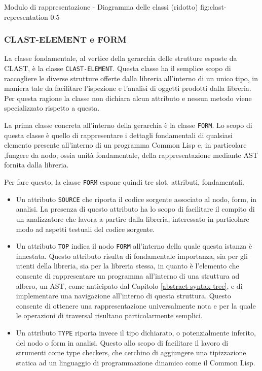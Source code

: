       {Modulo di rappresentazione - Diagramma delle classi (ridotto)}
      {fig:clast-representation}
      {0.5}

\subsubsection{CLAST-ELEMENT e FORM}

La classe fondamentale, al vertice della gerarchia delle strutture esposte da
CLAST, è la classe \texttt{CLAST-ELEMENT}. Questa classe ha il semplice scopo
di raccogliere le diverse strutture offerte dalla libreria all'interno di un
unico tipo, in maniera tale da facilitare l’ispezione e l’analisi di oggetti
prodotti dalla libreria. Per questa ragione la classe non dichiara alcun
attributo e nessun metodo viene specializzato rispetto a questa.

La prima classe concreta all’interno della gerarchia è la classe \texttt{FORM}.
Lo scopo di questa classe è quello di rappresentare i dettagli fondamentali di
qualsiasi elemento presente all’interno di un programma Common Lisp e, in
particolare ,fungere da nodo, ossia unità fondamentale, della rappresentazione
mediante AST fornita dalla libreria.

Per fare questo, la classe \texttt{FORM} espone quindi tre slot, attributi,
fondamentali.

\begin{itemize}

\item Un attributo \texttt{SOURCE} che riporta il codice sorgente associato al
nodo, form, in analisi. La presenza di questo attributo ha lo scopo di
facilitare il compito di un analizzatore che lavora a partire dalla libreria,
interessato in particolare modo ad aspetti testuali del codice sorgente.

\item Un attributo \texttt{TOP} indica il nodo \texttt{FORM} all’interno della
quale questa istanza è innestata. Questo attributo risulta di fondamentale
importanza, sia per gli utenti della libreria, sia per la libreria stessa, in
quanto è l'elemento che consente di rappresentare un programma all’interno di
una struttura ad albero, un AST, come anticipato dal Capitolo
\ref{abstract-syntax-tree}, e di implementare una navigazione all'interno di
questa struttura. Questo consente di ottenere una rappresentazione
universalmente nota e per la quale le operazioni di traversal risultano
particolarmente semplici.

\item Un attributo \texttt{TYPE} riporta invece il tipo dichiarato, o
potenzialmente inferito, del nodo o form in analisi. Questo allo scopo di
facilitare il lavoro di strumenti come type checkers, che cerchino di aggiungere
una tipizzazione statica ad un linguaggio di programmazione dinamico come il
Common Lisp.

\end{itemize}

